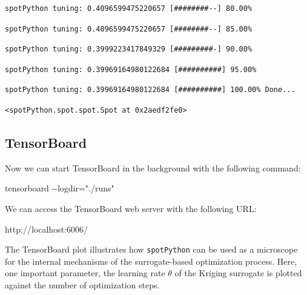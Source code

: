 \documentclass[
  letterpaper,
  DIV=11,
  numbers=noendperiod]{scrreprt}
\newenvironment{Shaded}{\begin{snugshade}}{\end{snugshade}}
\newcommand{\NormalTok}[1]{\textcolor[rgb]{0.00,0.23,0.31}{#1}}
\begin{document}
\begin{verbatim}
spotPython tuning: 0.4096599475220657 [########--] 80.00% 
\end{verbatim}

\begin{verbatim}
spotPython tuning: 0.4096599475220657 [########--] 85.00% 
\end{verbatim}

\begin{verbatim}
spotPython tuning: 0.3999223417849329 [#########-] 90.00% 
\end{verbatim}

\begin{verbatim}
spotPython tuning: 0.39969164980122684 [##########] 95.00% 
\end{verbatim}

\begin{verbatim}
spotPython tuning: 0.39969164980122684 [##########] 100.00% Done...
\end{verbatim}

\begin{verbatim}
<spotPython.spot.spot.Spot at 0x2aedf2fe0>
\end{verbatim}

\hypertarget{tensorboard-1}{%
\subsection{TensorBoard}\label{tensorboard-1}}

Now we can start TensorBoard in the background with the following
command:

\begin{Shaded}
\begin{Highlighting}[]
\NormalTok{tensorboard {-}{-}logdir="./runs"}
\end{Highlighting}
\end{Shaded}

We can access the TensorBoard web server with the following URL:

\begin{Shaded}
\begin{Highlighting}[]
\NormalTok{http://localhost:6006/}
\end{Highlighting}
\end{Shaded}

The TensorBoard plot illustrates how \texttt{spotPython} can be used as
a microscope for the internal mechanisms of the surrogate-based
optimization process. Here, one important parameter, the learning rate
\(\theta\) of the Kriging surrogate is plotted against the number of
optimization steps.
\end{document}
